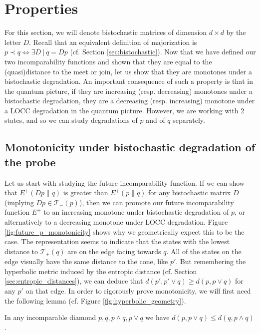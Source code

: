 \section{Properties}

For this section, we will denote bistochastic matrices of dimension $d\times d$ by the letter $D$. Recall that an equivalent definition of majorization is $p \prec q \iff \exists D \: | \: q = Dp$ (cf. Section \ref{sec:bistochastic}). Now that we have defined our two incomparability functions and shown that they are equal to the (quasi)distance to the meet or join, let us show that they are monotones under a bistochastic degradation. An important consequence of such a property is that in the quantum picture, if they are increasing (resp. decreasing) monotones under a bistochastic degradation, they are a decreasing (resp. increasing) monotone under a LOCC degradation in the quantum picture. However, we are working with 2 states, and so we can study degradations of $p$ and of $q$ separately.



\subsection{Monotonicity under bistochastic degradation of the probe} \label{sec:p_monotonicity}

Let us start with studying the future incomparability function. If we can show that $E^+(Dp \parallel q)$ is greater than $E^+(p \parallel q)$ for any bistochastic matrix $D$ (implying $Dp \in \mathcal{T}_-(p)$), then we can promote our future incomparability function $E^+$ to an increasing monotone under bistochastic degradation of $p$, or alternatively to a decreasing monotone under LOCC degradation. Figure \ref{fig:future_p_monotonicity} shows why we geometrically expect this to be the case. The representation seems to indicate that the states with the lowest distance to $\mathcal{T}_+(q)$ are on the edge facing towards $q$. All of the states on the edge visually have the same distance to the cone, like $p'$. But remembering the hyperbolic metric induced by the entropic distance (cf. Section \ref{sec:entropic_distances}), we can deduce that $d(p', p' \vee q) \geq d(p, p \vee q)$ for any $p'$ on that edge. In order to rigorously prove monotonicity, we will first need the following lemma (cf. Figure \ref{fig:hyperbolic_geometry}).

\begin{lemma} \label{lem:incomparable_diamond}
    In any incomparable diamond $p, q, p \wedge q, p \vee q$ we have $d(p, p \vee q) \leq d(q, p \wedge q)$.
\end{lemma}


